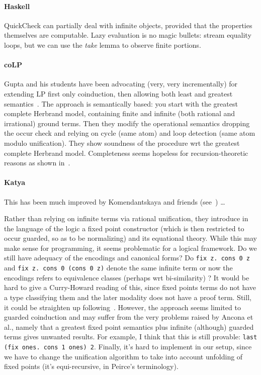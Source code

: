 
\paragraph{Haskell}

QuickCheck can partially deal with infinite objects, provided that the properties themselves are computable. Lazy evaluation is no magic bullets: stream equality loops, but we can use the \emph{take} lemma to observe finite portions.

\paragraph{coLP}

Gupta and his students have been advocating (very, very incrementally)
for extending LP first only coinduction, then allowing both least and
greatest semantics~\cite{Luke07}. The approach is semantically based:
you start with the greatest complete Herbrand model, containing finite
and infinite (both rational and irrational) ground terms. Then they
modify the operational semantics dropping the occur check and relying
on cycle (same atom) and loop detection (same atom modulo
unification). They show soundness of the procedure wrt the greatest
complete Herbrand model. Completeness seems hopeless for
recursion-theoretic reasons as shown in~\cite{AnconaD15}.

\paragraph{Katya}
This has been much improved by Komendantskaya and friends (see~\cite{BasoldKL19}) \dots

Rather than relying on infinite terms via rational unification, they
introduce in the language of the logic a fixed point constructor
(which is then restricted to occur guarded, so as to be normalizing)
and its equational theory. While this may make sense for programming,
it seems problematic for a logical framework. Do we still have
adequacy of the encodings and canonical forms? Do \texttt{fix z.~cons
  0 z} and \texttt{fix z.~cons 0 (cons 0 z)} denote the same infinite
term or now the encodings refers to equivalence classes (perhaps wrt
bi-similarity) ? It would be hard to give a Curry-Howard reading of
this, since fixed points terms do not have a type classifying them and
the later modality does not have a proof term. Still, it could be
straighten up following~\cite{abelVezzosi:aplas14}. However, the
approach seems limited to guarded coinduction and may suffer from the
very problems raised by Ancona et al., namely  that a greatest fixed point semantics plus infinite (although) guarded terms gives unwanted results. For example, I think that  this is
still provable: \texttt{last (fix ones.~cons 1 ones) 2}. Finally, it's hard to implement in our setup, since we have to change the unification algorithm to take into account unfolding of fixed points (it's equi-recursive, in Peirce's terminology).


